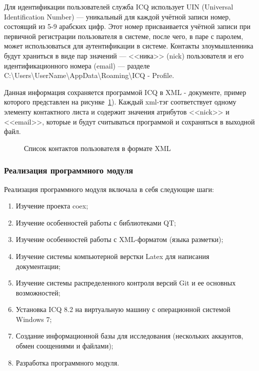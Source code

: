 Для идентификации пользователей служба ICQ использует UIN (Universal Identification Number) --- уникальный для каждой учётной записи номер, состоящий из 5-9 арабских цифр. Этот номер присваивается учётной записи при первичной регистрации пользователя в системе, после чего, в паре с паролем, может использоваться для аутентификации в системе. Контакты злоумышленника будут храниться в виде пар 
значений --- <<ника>> (nick) пользователя и его идентификационного номера (email) --- разделе C:\textbackslash Users\textbackslash UserName\textbackslash AppData\textbackslash Roaming\textbackslash ICQ - Profile. 


Данная информация сохраняется программой ICQ в XML - документе, пример которого представлен на рисунке~\ref{xml_view:xml_view}). Каждый xml-тэг соответствует одному элементу контактного листа и содержит значения атрибутов <<nick>> и <<email>>, которые и будут считываться программой и сохраняться в выходной файл.

\begin{figure}[h!]
\caption{Список контактов пользователя в формате XML}
\label{xml_view:xml_view}
\end{figure}


\subsubsection{Реализация программного модуля}

Реализация программного модуля включала в себя следующие шаги:

\begin{enumerate}
\item Изучение проекта coex;
\item Изучение особенностей работы с библиотеками QT;
\item Изучение особенностей работы с XML-форматом (языка разметки);
\item Изучение системы компьютерной верстки  Latex для написания документации;
\item Изучение системы распределенного контроля версий Git и ее основных возможностей; 
\item Установка ICQ 8.2 на виртуальную машину с операционной системой Windows 7;
\item Создание информационной базы для исследования (нескольких аккаунтов, обмен соощениями и файлами);
\item Разработка программного модуля.
\end{enumerate}


